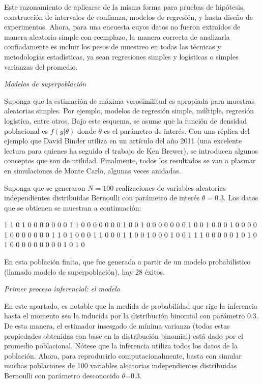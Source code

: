 \documentclass[
  12pt,
]{book}
\begin{document}
Este razonamiento de aplicarse de la misma forma para pruebas de hipótesis, construcción de intervalos de confianza, modelos de regresión, y hasta diseño de experimentos. Ahora, para una encuesta cuyos datos no fueron extraídos de manera aleatoria simple con reemplazo, la manera correcta de analizarla confiadamente es incluir los pesos de muestreo en todas las técnicas y metodologías estadísticas, ya sean regresiones simples y logísticas o simples varianzas del promedio.

\emph{Modelos de superpoblación}

Suponga que la estimación de máxima verosimilitud es apropiada para muestras aleatorias simples. Por ejemplo, modelos de regresión simple, múltiple, regresión logística, entre otros. Bajo este esquema, se asume que la función de densidad poblacional es \(f(y | \theta)\) donde \(\theta\) es el parámetro de interés. Con una réplica del ejemplo que David Binder utiliza en un artículo del año 2011 (una excelente lectura para quienes ha seguido el trabajo de Ken Brewer), se introducen algunos conceptos que son de utilidad. Finalmente, todos los resultados se van a plasmar en simulaciones de Monte Carlo, algunas veces anidadas.

Suponga que se generaron \(N=100\) realizaciones de variables aleatorias independientes distribuidas Bernoulli con parámetro de interés \(\theta=0.3\). Los datos que se obtienen se muestran a continuación:

1 1 0 1 0 0 0 0 0 0 0 1 1 0 0 0 0 0 0 0 1 0 0 1 0 0 0 0 0 0 0 1 0
0 1 0 0 0 1 0 0 0 0 1 0 0 0 0 0 0 0 1 1 0 1 0 0 0 1 1 0 0 0 1 1 0
0 1 0 0 0 1 0 0 1 1 1 0 0 0 0 0 1 0 1 0 1 0 0 0 0 0 0 0 0 0 1 0 1 0

En esta población finita, que fue generada a partir de un modelo probabilístico (llamado modelo de superpoblación), hay 28 éxitos.

\emph{Primer proceso inferencial: el modelo}

En este apartado, es notable que la medida de probabilidad que rige la inferencia hasta el momento sea la inducida por la distribución binomial con parámetro 0.3. De esta manera, el estimador insesgado de mínima varianza (todas estas propiedades obtenidas con base en la distribución binomial) está dado por el promedio poblacional. Nótese que la inferencia utiliza todos los datos de la población. Ahora, para reproducirlo computacionalmente, basta con simular muchas poblaciones de 100 variables aleatorias independientes distribuidas Bernoulli con parámetro desconocido \(\theta\)=0.3.
\end{document}
